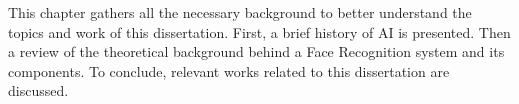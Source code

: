 \documentclass[class=report, crop=false, a4paper, 12pt]{standalone}
\begin{document}
This chapter gathers all the necessary background to better understand the topics and work of this dissertation. First, a brief history of \gls{AI} is presented. Then a review of the theoretical background behind a Face Recognition system and its components. To conclude, relevant works related to this dissertation are discussed.


%
\end{document}
